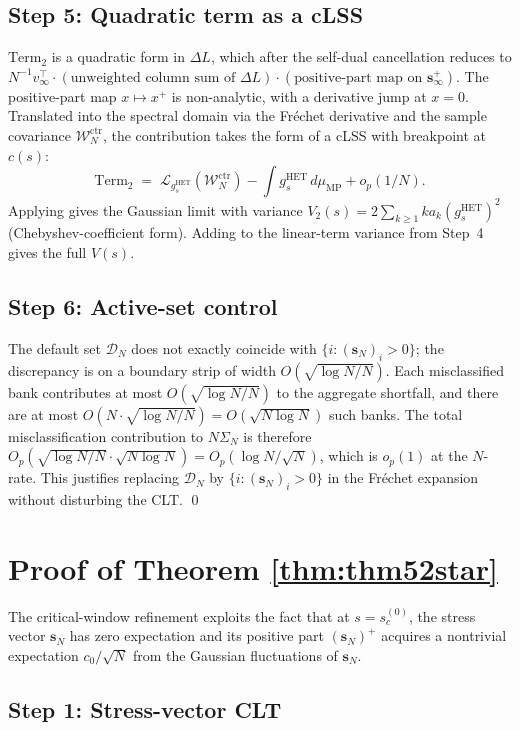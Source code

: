 \documentclass[11pt,a4paper]{article}
\theoremstyle{definition}
\newcommand{\WN}{\mathcal{W}_N^{\mathrm{ctr}}}
\newcommand{\SigmaN}{\Sigma_N}
\newcommand{\muMP}{\mu_{\mathrm{MP}}}
\newcommand{\Lcal}{\mathcal{L}}
\newcommand{\Dcal}{\mathcal{D}}
\newcommand{\HET}{\mathrm{HET}}
\begin{document}
\subsection{Step 5: Quadratic term as a cLSS}

$\mathrm{Term}_2$ is a quadratic form in $\Delta L$, which after the
self-dual cancellation reduces to
$N^{-1}v_\infty^\top\cdot(\text{unweighted column sum of }\Delta L)\cdot(\text{positive-part map on }\mathbf s_\infty^+)$.
The positive-part map $x\mapsto x^+$ is non-analytic, with a derivative jump
at $x = 0$. Translated into the spectral domain via the Fr\'echet derivative
and the sample covariance $\WN$, the contribution takes the form of a cLSS
with breakpoint at $c(s)$:
\[
\mathrm{Term}_2\;=\;\Lcal_{g_s^{\HET}}(\WN) - \int g_s^{\HET}\,d\muMP + o_p(1/N).
\]
Applying  gives the Gaussian limit with variance
$V_2(s) = 2\sum_{k\geq 1}k a_k(g_s^{\HET})^2$ (Chebyshev-coefficient form). Adding to
the linear-term variance from Step~4 gives the full $V(s)$.

\subsection{Step 6: Active-set control}

The default set $\Dcal_N$ does not exactly coincide with
$\{i:(\mathbf s_N)_i>0\}$; the discrepancy is on a boundary strip of width
$O(\sqrt{\log N/N})$. Each misclassified bank contributes at most
$O(\sqrt{\log N/N})$ to the aggregate shortfall, and there are at most
$O(N\cdot\sqrt{\log N/N}) = O(\sqrt{N\log N})$ such banks. The total
misclassification contribution to $N\SigmaN$ is therefore
$O_p(\sqrt{\log N/N}\cdot\sqrt{N\log N}) = O_p(\log N/\sqrt N)$,
which is $o_p(1)$ at the $N$-rate. This justifies replacing $\Dcal_N$ by
$\{i:(\mathbf s_N)_i>0\}$ in the Fr\'echet expansion without disturbing
the CLT. \qed

\section{Proof of Theorem \ref{thm:thm52star}}
\label{sec:proof-52star}

The critical-window refinement exploits the fact that at $s = s_c^{(0)}$,
the stress vector $\mathbf s_N$ has zero expectation and its positive part
$(\mathbf s_N)^+$ acquires a nontrivial expectation $c_0/\sqrt N$ from the
Gaussian fluctuations of $\mathbf s_N$.

\subsection{Step 1: Stress-vector CLT}
\end{document}
